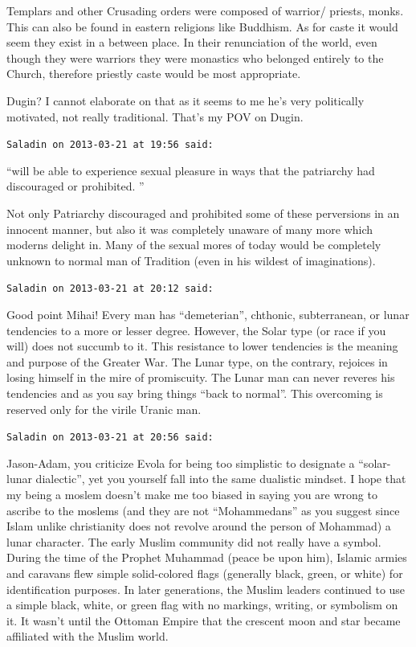 \begin{footnotesize}
\begin{sffamily}
Templars and other Crusading orders were composed of warrior/ priests, monks. This can also be found in eastern religions like Buddhism. As for caste it would seem they exist in a between place. In their renunciation of the world, even though they were warriors they were monastics who belonged entirely to the Church, therefore priestly caste would be most appropriate.

Dugin? I cannot elaborate on that as it seems to me he's very politically motivated, not really traditional. That's my POV on Dugin.

\hfill

\texttt{Saladin on 2013-03-21 at 19:56 said:}

``will be able to experience sexual pleasure in ways that the patriarchy had discouraged or prohibited. ''

Not only Patriarchy discouraged and prohibited some of these perversions in an innocent manner, but also it was completely unaware of many more which moderns delight in. Many of the sexual mores of today would be completely unknown to normal man of Tradition (even in his wildest of imaginations).

\hfill

\texttt{Saladin on 2013-03-21 at 20:12 said:}

Good point Mihai! Every man has ``demeterian'', chthonic, subterranean, or lunar tendencies to a more or lesser degree. However, the Solar type (or race if you will) does not succumb to it. This resistance to lower tendencies is the meaning and purpose of the Greater War. The Lunar type, on the contrary, rejoices in losing himself in the mire of promiscuity. The Lunar man can never reveres his tendencies and as you say bring things ``back to normal''. This overcoming is reserved only for the virile Uranic man.

\hfill

\texttt{Saladin on 2013-03-21 at 20:56 said:}

Jason-Adam, you criticize Evola for being too simplistic to designate a ``solar-lunar dialectic'', yet you yourself fall into the same dualistic mindset. I hope that my being a moslem doesn't make me too biased in saying you are wrong to ascribe to the moslems (and they are not ``Mohammedans'' as you suggest since Islam unlike christianity does not revolve around the person of Mohammad) a lunar character. The early Muslim community did not really have a symbol. During the time of the Prophet Muhammad (peace be upon him), Islamic armies and caravans flew simple solid-colored flags (generally black, green, or white) for identification purposes. In later generations, the Muslim leaders continued to use a simple black, white, or green flag with no markings, writing, or symbolism on it. It wasn't until the Ottoman Empire that the crescent moon and star became affiliated with the Muslim world.


\end{sffamily}
\end{footnotesize}
